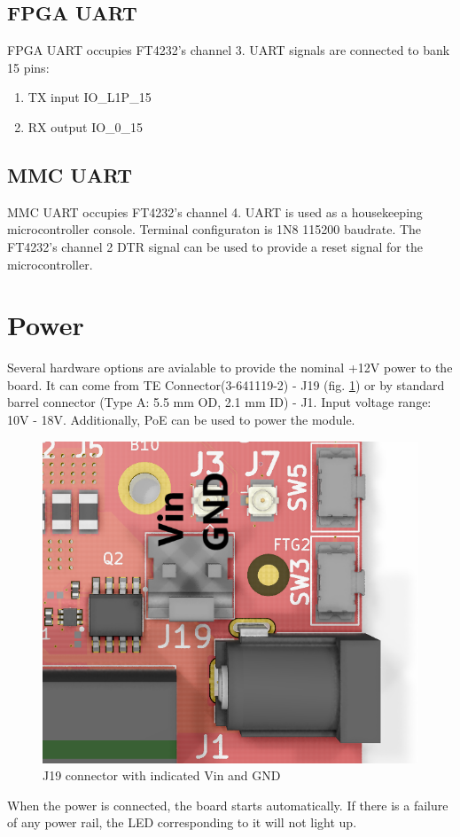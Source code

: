 \documentclass[12pt,oneside,a4]{article}
\begin{document}
\subsection{FPGA UART}
FPGA UART occupies FT4232's channel 3. UART signals are connected to bank 15 pins:
\begin{enumerate}
	\item TX input IO\_L1P\_15
	\item RX output IO\_0\_15
\end{enumerate}
\subsection{MMC UART}
MMC UART occupies FT4232's channel 4. UART is used as a housekeeping microcontroller console. Terminal configuraton is 1N8 115200 baudrate. The FT4232's channel 2 DTR signal can be used to provide a reset signal for the microcontroller.


\section{Power}
Several hardware options are avialable to provide the nominal +12V power to the board.
It can come from TE Connector(3-641119-2) - J19 (fig. \ref{j19}) or by standard barrel connector (Type A: 5.5 mm OD, 2.1 mm ID) - J1. Input voltage range: 10V - 18V. Additionally, PoE can be used to power the module.

\begin{figure}[H]
\begin{center}
\includegraphics[width=0.6\linewidth]{j1j19.png}
 \caption{J19 connector with indicated Vin and GND}\label{j19}
\end{center}
\end{figure}

When the power is connected, the board starts automatically. If there is a failure of any power rail, the LED corresponding to it will not light up.
\end{document}
